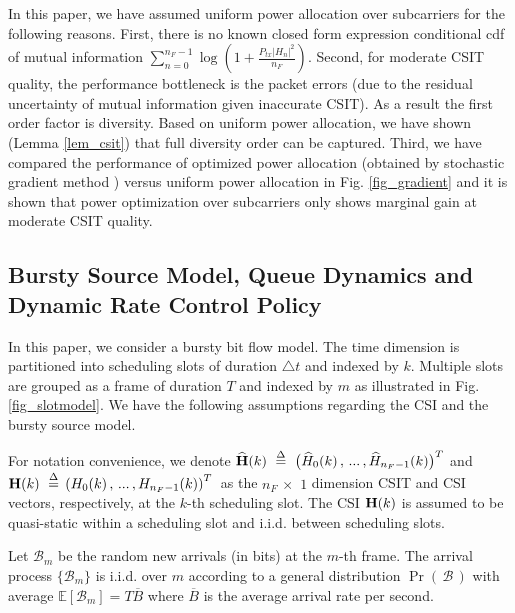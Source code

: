\documentclass[11pt,journal, onecolumn]{./IEEEtran}
\newcommand{\blue}{\color{black}}
\newcommand{\red}{\color{black}}
\begin{document}
{\red
\begin{Remark}
In this paper, we have assumed uniform power allocation over subcarriers for the following reasons. First, there is no known closed form expression conditional cdf of mutual information $\sum\nolimits_{n = 0}^{{n_F} - 1} {\log \left( {1 + \frac{{{P_{tx}}{{\left| {{H_n}} \right|}^2}}}{{{n_F}}}} \right)}$. Second, for moderate CSIT quality, the performance bottleneck is the packet errors (due to the residual uncertainty of mutual information given inaccurate CSIT). As a result the first order factor is diversity. Based on uniform power allocation, we have shown (Lemma \ref{lem_csit}) that full diversity order can be captured. Third, we have compared the performance of optimized power allocation  {\blue (obtained by stochastic gradient method \cite{BertsekasNeuro:1996,Borkarbook:2008})} versus uniform power allocation in Fig. \ref{fig_gradient} and it is shown that power optimization over subcarriers only shows marginal gain at moderate CSIT quality. ~\hfill\IEEEQED
\end{Remark}}



\subsection{Bursty Source Model, Queue Dynamics and Dynamic Rate Control Policy}
In this paper, we consider a bursty bit flow model. The time dimension is partitioned into scheduling slots of duration $\triangle t$ and indexed by $k$. Multiple slots are grouped as a frame of duration $T$ and indexed by $m$ as illustrated in Fig. \ref{fig_slotmodel}. We have the following assumptions regarding the CSI and the bursty source model.

\begin{Assumption}
 For notation convenience, we denote $\widehat{\bf{H}}(k)\,\, \buildrel \Delta \over = \,\,{\big( {{{\widehat H}_0}(k)\,,\,...\,,{{\widehat{H}}_{{n_F} - 1}}(k)} \big)^T}$ and ${\bf{H}}(k)\,\, \buildrel \Delta \over = \,{\left( {{H_0}(k)\,,\,...\,,{H_{{n_F} - 1}}(k)} \right)^T}\,$ as the ${n_F}\, \times \,\,1$ dimension CSIT and CSI vectors, respectively, at the $k$-th scheduling slot. The CSI ${\bf{H}}(k)$ is assumed to be quasi-static within a scheduling slot and i.i.d. between scheduling slots. ~\hfill\IEEEQED
\end{Assumption}

\begin{Assumption}
 Let $\mathcal B_m$ be the random new arrivals (in bits) at the $m$-th frame. The arrival process $\{\mathcal B_m\}$ is i.i.d. over $m$ according to a general distribution $\Pr (\,\mathcal B\,)$ with average $\mathbb{E}[{\mathcal B_m}]=T\overline{B}$ where $\overline{B}$ is the average arrival rate per second. ~\hfill\IEEEQED
\end{Assumption}
\end{document}
